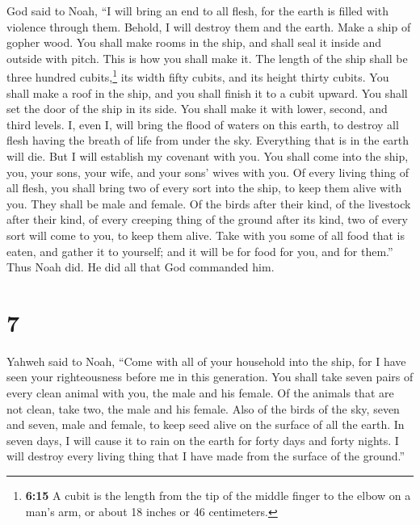  God said to Noah, ``I will bring an end to all flesh,
for the earth is filled with violence through them. Behold, I will
destroy them and the earth.  Make a ship of gopher wood.
You shall make rooms in the ship, and shall seal it inside and outside
with pitch.  This is how you shall make it. The length of
the ship shall be three hundred cubits,\footnote{\textbf{6:15} A cubit
  is the length from the tip of the middle finger to the elbow on a
  man's arm, or about 18 inches or 46 centimeters.} its width fifty
cubits, and its height thirty cubits.  You shall make a
roof in the ship, and you shall finish it to a cubit upward. You shall
set the door of the ship in its side. You shall make it with lower,
second, and third levels.  I, even I, will bring the
flood of waters on this earth, to destroy all flesh having the breath of
life from under the sky. Everything that is in the earth will die.
 But I will establish my covenant with you. You shall
come into the ship, you, your sons, your wife, and your sons' wives with
you.  Of every living thing of all flesh, you shall bring
two of every sort into the ship, to keep them alive with you. They shall
be male and female.  Of the birds after their kind, of
the livestock after their kind, of every creeping thing of the ground
after its kind, two of every sort will come to you, to keep them alive.
 Take with you some of all food that is eaten, and gather
it to yourself; and it will be for food for you, and for them.''
 Thus Noah did. He did all that God commanded him.

\hypertarget{section-6}{%
\section{7}\label{section-6}}

 Yahweh said to Noah, ``Come with all of your household
into the ship, for I have seen your righteousness before me in this
generation.  You shall take seven pairs of every clean
animal with you, the male and his female. Of the animals that are not
clean, take two, the male and his female.  Also of the
birds of the sky, seven and seven, male and female, to keep seed alive
on the surface of all the earth.  In seven days, I will
cause it to rain on the earth for forty days and forty nights. I will
destroy every living thing that I have made from the surface of the
ground.''

